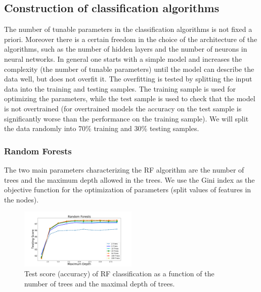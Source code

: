 \subsection{Construction of classification algorithms}

The number of tunable parameters in the classification algorithms is not fixed a priori. 
Moreover there is a certain freedom in the choice of the architecture of the algorithms, such as
the number of hidden layers and the number of neurons in neural networks.
In general one starts with a simple model and increases the complexity (the number of tunable parameters)
until the model can describe the data well, but does not overfit it.
The overfitting is tested by splitting the input data into the training and testing samples.
The training sample is used for optimizing the parameters,
while the test sample is used to check that the model is not overtrained (for overtrained models the accuracy on the test
sample is significantly worse than the performance on the training sample).
We will split the data randomly into 70\% training and 30\% testing samples.



\subsubsection{Random Forests}

The two main parameters characterizing the RF algorithm are the number of trees and the maximum depth allowed in the trees. 
We use the Gini index as the objective function for the optimization of parameters (split values of features in the nodes).

\begin{figure}[h]

\hspace*{-0.5cm}
\includegraphics[width=0.5\textwidth]{plots/rf_train_assocnewfeats.pdf}
\caption{
Test score (accuracy) of RF classification as a function of the number of trees and 
the maximal depth of trees.
}
\label{fig:RF_complexity}
\end{figure}

